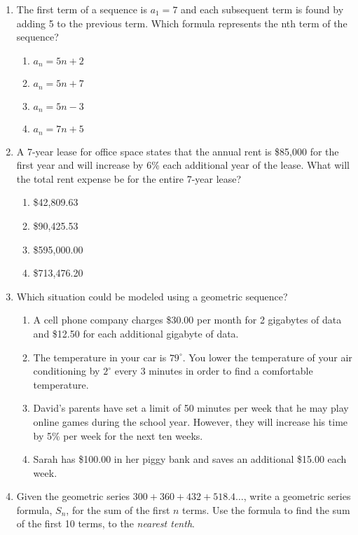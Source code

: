 \documentclass[12pt, twoside]{article}
\begin{document}
\begin{enumerate}[itemsep=0.5cm]
\item The first term of a sequence is $a_1 = 7$ and each subsequent term is found by adding 5 to the previous term. Which formula represents the nth term of the sequence?
\begin{enumerate}
    \item $a_n = 5n + 2$
    \item $a_n = 5n + 7$
    \item $a_n = 5n - 3$
    \item $a_n = 7n + 5$
\end{enumerate}

\item A 7-year lease for office space states that the annual rent is \$85,000 for the first year and will increase by 6\% each additional year of the lease. What will the total rent expense be for the entire 7-year lease?
\begin{enumerate}
    \item \$42,809.63
    \item \$90,425.53
    \item \$595,000.00
    \item \$713,476.20
\end{enumerate}


\item Which situation could be modeled using a geometric sequence?
\begin{enumerate}
    \item A cell phone company charges \$30.00 per month for 2 gigabytes of data and \$12.50 for each additional gigabyte of data.
    \item The temperature in your car is $79^\circ$. You lower the temperature of your air conditioning by $2^\circ$ every 3 minutes in order to find a comfortable temperature.
    \item David's parents have set a limit of 50 minutes per week that he may play online games during the school year. However, they will increase his time by 5\% per week for the next ten weeks.
    \item Sarah has \$100.00 in her piggy bank and saves an additional \$15.00 each week.
\end{enumerate}

\item Given the geometric series $300 + 360 + 432 + 518.4 \dots$, write a geometric series formula, $S_n$, for the sum of the first $n$ terms. Use the formula to find the sum of the first 10 terms, to the \emph{nearest tenth}.


\end{enumerate}
\end{document}
